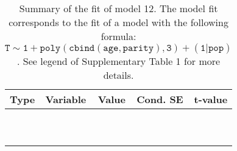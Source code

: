 \begin{table}[H]

\caption{\label{tab:tab12}Summary of the fit of model 12. The model fit corresponds to the fit of a model with the following formula: {\small$\mathtt{T \sim 1 + poly(cbind(age, parity), 3) + (1 | pop)}$}. See legend of Supplementary Table 1 for more details.}
\centering
\fontsize{8}{10}\selectfont
\begin{tabular}[t]{>{\raggedright\arraybackslash}p{3cm}>{\raggedright\arraybackslash}p{5cm}rrr}
\toprule
Type & Variable & Value & Cond. SE & t-value\\
\midrule
\cellcolor{gray!6}{fixed effects} & \cellcolor{gray!6}{$\beta_1$} & \cellcolor{gray!6}{-4.08} & \cellcolor{gray!6}{0.111} & \cellcolor{gray!6}{-36.8}\\
\cellcolor{gray!6}{} & \cellcolor{gray!6}{$\beta_{\mathtt{age}}$} & \cellcolor{gray!6}{71} & \cellcolor{gray!6}{30.7} & \cellcolor{gray!6}{2.32}\\
\cellcolor{gray!6}{} & \cellcolor{gray!6}{$\beta_{\mathtt{age}^2}$} & \cellcolor{gray!6}{-60.7} & \cellcolor{gray!6}{17} & \cellcolor{gray!6}{-3.57}\\
\cellcolor{gray!6}{} & \cellcolor{gray!6}{$\beta_{\mathtt{age}^3}$} & \cellcolor{gray!6}{-47.2} & \cellcolor{gray!6}{16.3} & \cellcolor{gray!6}{-2.9}\\
\cellcolor{gray!6}{} & \cellcolor{gray!6}{$\beta_{\mathtt{parity}}$} & \cellcolor{gray!6}{1.54} & \cellcolor{gray!6}{39.4} & \cellcolor{gray!6}{0.0392}\\
\cellcolor{gray!6}{} & \cellcolor{gray!6}{$\beta_{\mathtt{age}\times\mathtt{parity}}$} & \cellcolor{gray!6}{-4468} & \cellcolor{gray!6}{11667} & \cellcolor{gray!6}{-0.383}\\
\cellcolor{gray!6}{} & \cellcolor{gray!6}{$\beta_{\mathtt{age}^2\times\mathtt{parity}}$} & \cellcolor{gray!6}{7856} & \cellcolor{gray!6}{8568} & \cellcolor{gray!6}{0.917}\\
\cellcolor{gray!6}{} & \cellcolor{gray!6}{$\beta_{\mathtt{parity}^2}$} & \cellcolor{gray!6}{19.3} & \cellcolor{gray!6}{26.7} & \cellcolor{gray!6}{0.721}\\
\cellcolor{gray!6}{} & \cellcolor{gray!6}{$\beta_{\mathtt{age}\times\mathtt{parity}^2}$} & \cellcolor{gray!6}{-4441} & \cellcolor{gray!6}{7983} & \cellcolor{gray!6}{-0.556}\\
\cellcolor{gray!6}{} & \cellcolor{gray!6}{$\beta_{\mathtt{parity}^3}$} & \cellcolor{gray!6}{-18.8} & \cellcolor{gray!6}{13.9} & \cellcolor{gray!6}{-1.35}\\

\end{tabular}
\end{table}
